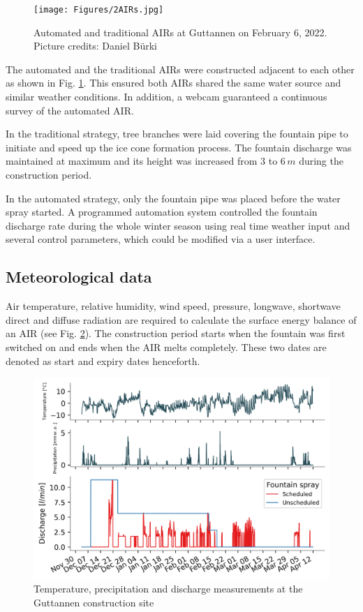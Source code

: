 \documentclass[tc, manuscript]{copernicus}
\begin{document}
\begin{figure}[t]
\texttt{[image: Figures/2AIRs.jpg]}
\caption{Automated and traditional AIRs  at Guttannen on February 6, 2022. Picture credits: Daniel Bürki}
\label{fig:2AIR} 
\end{figure}

The automated and the traditional AIRs were constructed adjacent to each other as shown in Fig. \ref{fig:2AIR}.
This ensured both AIRs shared the same water source and similar weather conditions. In addition, a webcam
guaranteed a continuous survey of the automated AIR.   

In the traditional strategy, tree branches were laid covering the fountain pipe to initiate and speed up the ice
cone formation process. The fountain discharge was maintained at maximum and its height was increased from 3 to
6\,$m$ during the construction period.

In the automated strategy, only the fountain pipe was placed before the water spray started. A programmed
automation system controlled the fountain discharge rate during the whole winter season using real time weather
input and several control parameters, which could be modified via a user interface. 

\subsection{Meteorological data}

Air temperature, relative humidity, wind speed, pressure, longwave, shortwave direct and diffuse radiation are
required to calculate the surface energy balance of an AIR (see Fig. \ref{fig:aws}). The construction period
starts when the fountain was first switched on and ends when the AIR melts completely. These two dates are denoted
as start and expiry dates henceforth.

\begin{figure}[t]
\includegraphics[width=12cm]{Figures/data.png}
\caption{Temperature, precipitation and discharge measurements at the Guttannen construction site}
\label{fig:aws} 
\end{figure}
\end{document}
